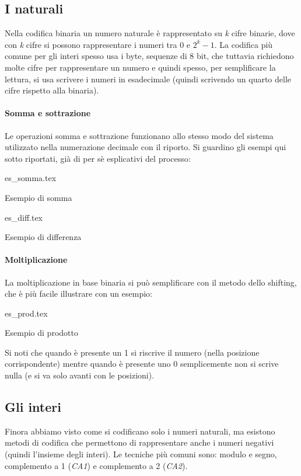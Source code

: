 \documentclass[class=book, crop=false, oneside]{standalone}
\begin{document}
\subsection{I naturali}
Nella codifica binaria un numero naturale è rappresentato su \emph{k} cifre binarie, dove con \emph{k} cifre si possono rappresentare i numeri tra 0 e \(2^{k}-1\). La codifica più comune per gli interi spesso usa i byte, sequenze di 8 bit, che tuttavia richiedono molte cifre per rappresentare un numero e quindi spesso, per semplificare la lettura, si usa scrivere i numeri in esadecimale (quindi scrivendo un quarto delle cifre rispetto alla binaria).

\paragraph*{Somma e sottrazione}
Le operazioni somma e sottrazione funzionano allo stesso modo del sistema utilizzato nella numerazione decimale con il riporto. Si guardino gli esempi qui sotto riportati, già di per sè esplicativi del processo:
\vspace{10px}

\begin{table}[h!]
	\centering
	{es_somma.tex}
	\caption{Esempio di somma}
\end{table}
\begin{table}[h!]
	\centering
	{es_diff.tex}
	\caption{Esempio di differenza}
\end{table}

\paragraph*{Moltiplicazione}
La moltiplicazione in base binaria si può semplificare con il metodo dello shifting, che è più facile illustrare con un esempio:
\begin{table}[H]
	\centering
	{es_prod.tex}
	\caption{Esempio di prodotto}
\end{table}
Si noti che quando è presente un 1 si riscrive il numero (nella posizione corrispondente) mentre  quando è presente uno 0 semplicemente non si scrive nulla (e si va solo avanti con le posizioni).

\subsection{Gli interi}
Finora abbiamo visto come si codificano solo i numeri naturali, ma esistono metodi di codifica che permettono di rappresentare anche i numeri negativi (quindi l’insieme degli interi). Le tecniche più comuni sono: modulo e segno, complemento a 1 (\emph{CA1}) e complemento a 2 (\emph{CA2}).
\end{document}

